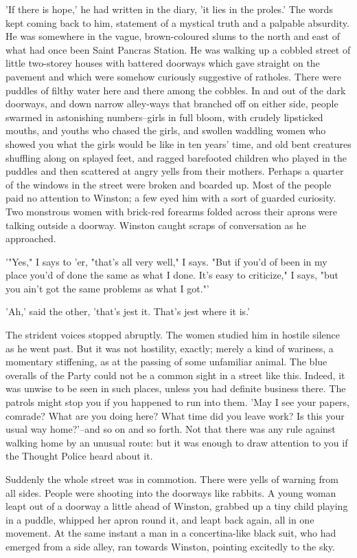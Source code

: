 \documentclass{article}
\begin{document}
'If there is hope,' he had written in the diary, 'it lies in the proles.'
The words kept coming back to him, statement of a mystical truth and a
palpable absurdity. He was somewhere in the vague, brown-coloured slums
to the north and east of what had once been Saint Pancras Station. He was
walking up a cobbled street of little two-storey houses with battered
doorways which gave straight on the pavement and which were somehow
curiously suggestive of ratholes. There were puddles of filthy water here
and there among the cobbles. In and out of the dark doorways, and down
narrow alley-ways that branched off on either side, people swarmed in
astonishing numbers--girls in full bloom, with crudely lipsticked mouths,
and youths who chased the girls, and swollen waddling women who showed you
what the girls would be like in ten years' time, and old bent creatures
shuffling along on splayed feet, and ragged barefooted children who played
in the puddles and then scattered at angry yells from their mothers.
Perhaps a quarter of the windows in the street were broken and boarded up.
Most of the people paid no attention to Winston; a few eyed him with a
sort of guarded curiosity. Two monstrous women with brick-red forearms
folded across their aprons were talking outside a doorway. Winston caught
scraps of conversation as he approached.

'"Yes," I says to 'er, "that's all very well," I says. "But if you'd of
been in my place you'd of done the same as what I done. It's easy to
criticize," I says, "but you ain't got the same problems as what I got."'

'Ah,' said the other, 'that's jest it. That's jest where it is.'

The strident voices stopped abruptly. The women studied him in hostile
silence as he went past. But it was not hostility, exactly; merely a kind
of wariness, a momentary stiffening, as at the passing of some unfamiliar
animal. The blue overalls of the Party could not be a common sight in a
street like this. Indeed, it was unwise to be seen in such places, unless
you had definite business there. The patrols might stop you if you happened
to run into them. 'May I see your papers, comrade? What are you doing here?
What time did you leave work? Is this your usual way home?'--and so on and
so forth. Not that there was any rule against walking home by an unusual
route: but it was enough to draw attention to you if the Thought Police
heard about it.

Suddenly the whole street was in commotion. There were yells of warning
from all sides. People were shooting into the doorways like rabbits. A
young woman leapt out of a doorway a little ahead of Winston, grabbed up a
tiny child playing in a puddle, whipped her apron round it, and leapt back
again, all in one movement. At the same instant a man in a concertina-like
black suit, who had emerged from a side alley, ran towards Winston,
pointing excitedly to the sky.
\end{document}
